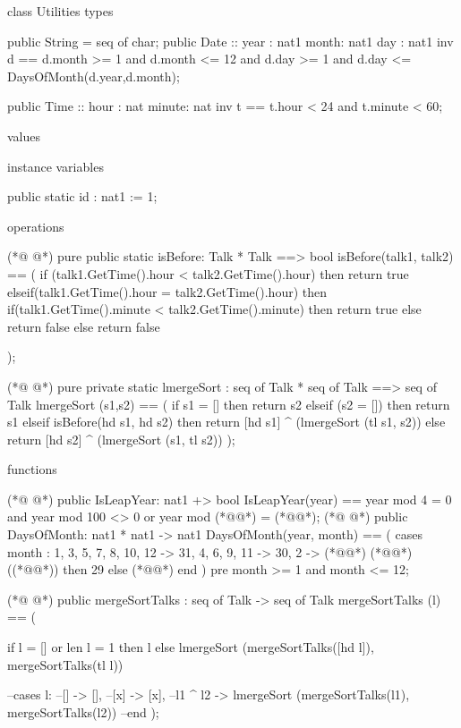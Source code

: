 \begin{vdmpp}[breaklines=true]
class Utilities
types

 public String = seq of char;
 public Date :: year : nat1
         month: nat1
          day : nat1
   inv d == d.month >= 1 and d.month <= 12 and d.day >= 1 and d.day <= DaysOfMonth(d.year,d.month);
   
 public Time :: hour : nat
         minute: nat
   inv t == t.hour < 24 and t.minute < 60;
   

   
values

instance variables

 public static id : nat1 := 1;

operations

(*@
\label{isBefore:24}
@*)
 pure public static isBefore: Talk * Talk ==> bool
  isBefore(talk1, talk2) == (
   if (talk1.GetTime().hour < talk2.GetTime().hour)
   then return true
   elseif(talk1.GetTime().hour = talk2.GetTime().hour)
   then if(talk1.GetTime().minute < talk2.GetTime().minute)
     then return true
     else return false
   else return false
  
  );
  
(*@
\label{lmergeSort:36}
@*)
 pure private static lmergeSort : seq of Talk * seq of Talk ==> seq of Talk
  lmergeSort (s1,s2) == (
   if s1 = []
   then return s2
   elseif (s2 = [])
   then return s1
   elseif 
   isBefore(hd s1, hd s2)
   then return [hd s1] ^ (lmergeSort (tl s1, s2))
   else return [hd s2] ^ (lmergeSort (s1, tl s2))
  );
   
functions

(*@
\label{IsLeapYear:50}
@*)
 public IsLeapYear: nat1 +> bool IsLeapYear(year) == year mod 4 = 0 and year mod 100 <> 0 or year mod (*@@*) = (*@@*);
(*@
\label{DaysOfMonth:51}
@*)
 public DaysOfMonth: nat1 * nat1 -> nat1 DaysOfMonth(year, month) == ( cases month : 1, 3, 5, 7, 8, 10, 12 -> 31, 4, 6, 9, 11 -> 30, 2 -> (*@@*) (*@@*)((*@@*)) then 29 else (*@@*) end ) pre month >= 1 and month <= 12;
 
(*@
\label{mergeSortTalks:53}
@*)
 public mergeSortTalks : seq of Talk -> seq of Talk
  mergeSortTalks (l) == (
  
   if l = [] or len l = 1
   then l
   else lmergeSort (mergeSortTalks([hd l]), mergeSortTalks(tl l))

   --cases l:
   --[] -> [],
   --[x] -> [x],
   --l1 ^ l2 -> lmergeSort (mergeSortTalks(l1), mergeSortTalks(l2))
   --end
  );
 

\end{vdmpp}

